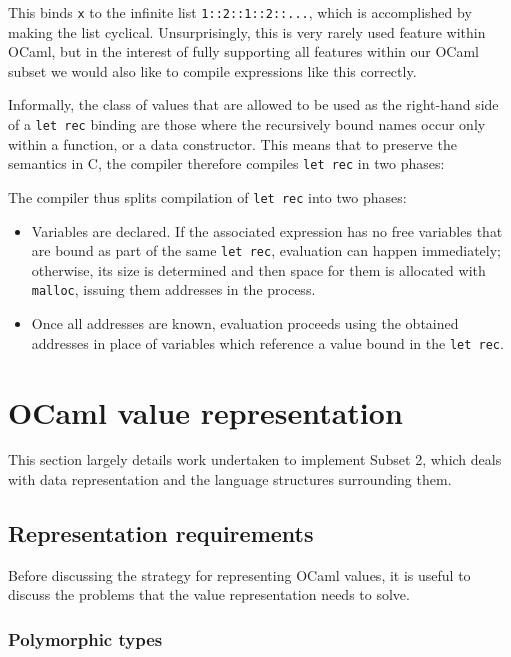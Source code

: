 This binds \texttt{x} to the infinite list \texttt{1::2::1::2::...}, which is
accomplished by making the list cyclical. Unsurprisingly, this is very rarely
used feature within OCaml, but in the interest of fully supporting all features
within our OCaml subset we would also like to compile expressions like this
correctly.

Informally, the class of values that are allowed to be used as the right-hand
side of a \texttt{let rec} binding are those where the recursively bound names
occur only within a function, or a data constructor. This means that to preserve
the semantics in C, the compiler therefore compiles \texttt{let rec} in two
phases:

The compiler thus splits compilation of \texttt{let rec} into two phases:

\begin{itemize} 
    
\item Variables are declared. If the associated expression has no free variables
    that are bound as part of the same \texttt{let rec}, evaluation can happen
    immediately; otherwise, its size is determined and then space for them is
    allocated with \texttt{malloc}, issuing them addresses in the process.        

\item Once all addresses are known, evaluation proceeds using the obtained
    addresses in place of variables which reference a value bound in the
    \texttt{let rec}.

\end{itemize}

\section{OCaml value representation} \label{value-repr}

This section largely details work undertaken to implement Subset 2, which deals 
with data representation and the language structures surrounding them.

\subsection{Representation requirements}

Before discussing the strategy for representing OCaml values, it is useful to
discuss the problems that the value representation needs to solve.

\subsubsection{Polymorphic types}

